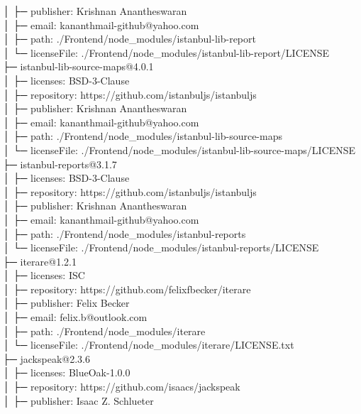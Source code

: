 \documentclass[
    paper=a4,
    twoside=false,
    parskip=half,
    listof=entryprefix,
    listof=totoc,
    index=totoc,
    bibliography=totoc,
    headsepline,
]{scrbook}
\begin{document}
    │  ├─ publisher: Krishnan Anantheswaran\\
    │  ├─ email: kananthmail-github@yahoo.com\\
    │  ├─ path: ./Frontend/node\_modules/istanbul-lib-report\\
    │  └─ licenseFile: ./Frontend/node\_modules/istanbul-lib-report/LICENSE\\
    ├─ istanbul-lib-source-maps@4.0.1\\
    │  ├─ licenses: BSD-3-Clause\\
    │  ├─ repository: https://github.com/istanbuljs/istanbuljs\\
    │  ├─ publisher: Krishnan Anantheswaran\\
    │  ├─ email: kananthmail-github@yahoo.com\\
    │  ├─ path: ./Frontend/node\_modules/istanbul-lib-source-maps\\
    │  └─ licenseFile: ./Frontend/node\_modules/istanbul-lib-source-maps/LICENSE\\
    ├─ istanbul-reports@3.1.7\\
    │  ├─ licenses: BSD-3-Clause\\
    │  ├─ repository: https://github.com/istanbuljs/istanbuljs\\
    │  ├─ publisher: Krishnan Anantheswaran\\
    │  ├─ email: kananthmail-github@yahoo.com\\
    │  ├─ path: ./Frontend/node\_modules/istanbul-reports\\
    │  └─ licenseFile: ./Frontend/node\_modules/istanbul-reports/LICENSE\\
    ├─ iterare@1.2.1\\
    │  ├─ licenses: ISC\\
    │  ├─ repository: https://github.com/felixfbecker/iterare\\
    │  ├─ publisher: Felix Becker\\
    │  ├─ email: felix.b@outlook.com\\
    │  ├─ path: ./Frontend/node\_modules/iterare\\
    │  └─ licenseFile: ./Frontend/node\_modules/iterare/LICENSE.txt\\
    ├─ jackspeak@2.3.6\\
    │  ├─ licenses: BlueOak-1.0.0\\
    │  ├─ repository: https://github.com/isaacs/jackspeak\\
    │  ├─ publisher: Isaac Z. Schlueter\\
\end{document}
